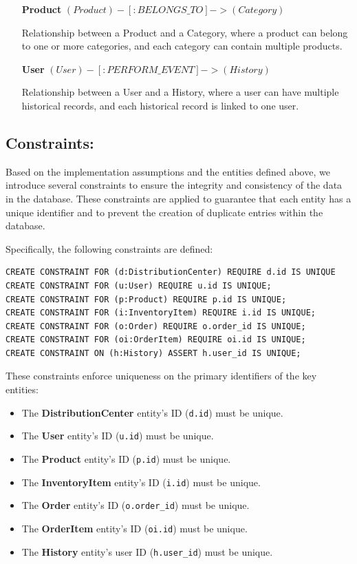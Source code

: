 \documentclass[a4paper,12pt]{article}
\begin{document}
\begin{itemize}[noitemsep]
        \item[\textbf{Product}] $(Product)-[:BELONGS\_TO]->(Category)$
        
        Relationship between a Product and a Category, where a product can belong to one or more categories, and each category can contain multiple products.

        \item[\textbf{User}] $(User)-[:PERFORM\_EVENT]->(History)$

        Relationship between a User and a History, where a user can have multiple historical records, and each historical record is linked to one user.
        
    \end{itemize}
    


\subsection{Constraints:}
\par Based on the implementation assumptions and the entities defined above, we introduce several constraints to ensure the integrity and consistency of the data in the database. These constraints are applied to guarantee that each entity has a unique identifier and to prevent the creation of duplicate entries within the database.

\par Specifically, the following constraints are defined:

\begin{verbatim}
CREATE CONSTRAINT FOR (d:DistributionCenter) REQUIRE d.id IS UNIQUE 
CREATE CONSTRAINT FOR (u:User) REQUIRE u.id IS UNIQUE;
CREATE CONSTRAINT FOR (p:Product) REQUIRE p.id IS UNIQUE;
CREATE CONSTRAINT FOR (i:InventoryItem) REQUIRE i.id IS UNIQUE;
CREATE CONSTRAINT FOR (o:Order) REQUIRE o.order_id IS UNIQUE;
CREATE CONSTRAINT FOR (oi:OrderItem) REQUIRE oi.id IS UNIQUE;
CREATE CONSTRAINT ON (h:History) ASSERT h.user_id IS UNIQUE;
\end{verbatim}

\par These constraints enforce uniqueness on the primary identifiers of the key entities:
\begin{itemize}[noitemsep]
    \item The \textbf{DistributionCenter} entity's ID (\texttt{d.id}) must be unique.
    \item The \textbf{User} entity's ID (\texttt{u.id}) must be unique.
    \item The \textbf{Product} entity's ID (\texttt{p.id}) must be unique.
    \item The \textbf{InventoryItem} entity's ID (\texttt{i.id}) must be unique.
    \item The \textbf{Order} entity's ID (\texttt{o.order\_id}) must be unique.
    \item The \textbf{OrderItem} entity's ID (\texttt{oi.id}) must be unique.
    \item The \textbf{History} entity's user ID (\texttt{h.user\_id}) must be unique.
\end{itemize}
\end{document}
